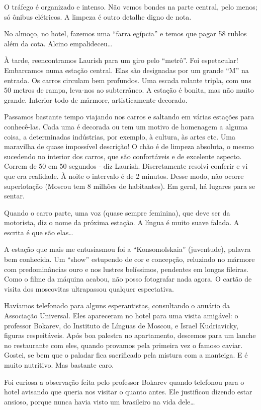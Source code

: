 O tráfego é organizado e intenso. Não vemos bondes na parte central, pelo menos; só ônibus elétricos. A limpeza é outro detalhe digno de nota.

No almoço, no hotel, fazemos uma “farra egípcia” e temos que pagar 58 rublos além da cota. Alcino empalideceu\ldots

À tarde, reencontramos Laurish para um giro pelo “metrô”. Foi espetacular! Embarcamos numa estação central. Elas são designadas por um grande “M” na entrada. Os carros circulam bem profundos. Uma escada rolante tripla, com uns 50 metros de rampa, leva-nos ao subterrâneo. A estação é bonita, mas não muito grande. Interior todo de mármore, artisticamente decorado.

Passamos bastante tempo viajando nos carros e saltando em várias estações para conhecê-las. Cada uma é decorada ou tem um motivo de homenagem a alguma coisa, a determinadas indústrias, por exemplo, à cultura, às artes etc. Uma maravilha de quase impossível descrição! O chão é de limpeza absoluta, o mesmo sucedendo no interior dos carros, que são confortáveis e de excelente aspecto. Correm de 50 em 50 segundos - diz Laurish. Discretamente resolvi conferir e vi que era realidade. À noite o intervalo é de 2 minutos. Desse modo, não ocorre superlotação (Moscou tem 8 milhões de habitantes). Em geral, há lugares para se sentar.

Quando o carro parte, uma voz (quase sempre feminina), que deve ser da motorista, diz o nome da próxima estação. A língua é muito suave falada. A escrita é que são elas\ldots

A estação que mais me entusiasmou foi a “Konsomolskaia” (juventude), palavra bem conhecida. Um “show” estupendo de cor e concepção, reluzindo no mármore com predominâncias ouro e nos lustres belíssimos, pendentes em longas fileiras. Como o filme da máquina acabou, não posso fotografar nada agora. O cartão de visita dos moscovitas ultrapassou qualquer espectativa.

Havíamos telefonado para alguns esperantistas, consultando o anuário da Associação Universal. Eles apareceram no hotel para uma visita amigável: o professor Bokarev, do Instituto de Línguas de Moscou, e Israel Kudriavicky, figuras respeitáveis. Após boa palestra no apartamento, descemos para um lanche no restaurante com eles, quando provamos pela primeira vez o famoso caviar. Gostei, se bem que o paladar fica sacrificado pela mistura com a manteiga. E é muito nutritivo. Mas bastante caro.

Foi curiosa a observação feita pelo professor Bokarev quando telefonou para o hotel avisando que queria nos visitar o quanto antes. Ele justificou dizendo estar ansioso, porque nunca havia visto um brasileiro na vida dele\ldots

